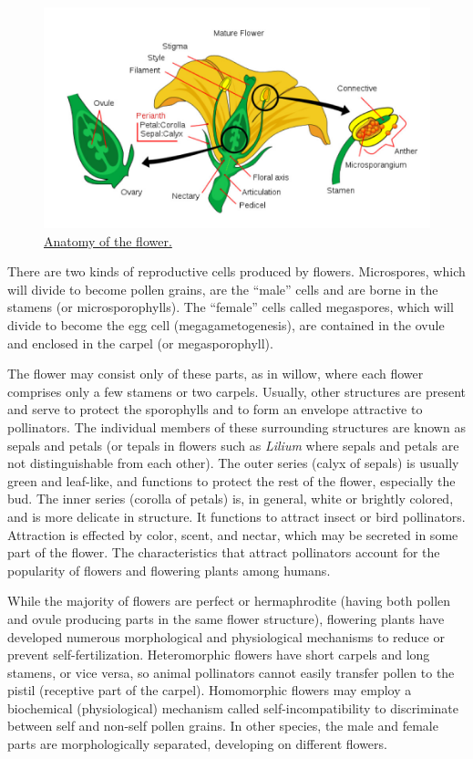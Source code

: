 \begin{figure}

{\centering \includegraphics[width=0.7\linewidth]{./figures/gymnosperms/mature_flower}

}

\caption{\href{https://commons.wikimedia.org/wiki/File:Mature_flower_diagram.svg}{Anatomy
of the flower.}}\label{fig:flower}
\end{figure}

There are two kinds of reproductive cells produced by flowers.
Microspores, which will divide to become pollen grains, are the ``male''
cells and are borne in the stamens (or microsporophylls). The ``female''
cells called megaspores, which will divide to become the egg cell
(megagametogenesis), are contained in the ovule and enclosed in the
carpel (or megasporophyll).

The flower may consist only of these parts, as in willow, where each
flower comprises only a few stamens or two carpels. Usually, other
structures are present and serve to protect the sporophylls and to form
an envelope attractive to pollinators. The individual members of these
surrounding structures are known as sepals and petals (or tepals in
flowers such as \emph{Lilium} where sepals and petals are not distinguishable
from each other). The outer series (calyx of sepals) is usually green
and leaf-like, and functions to protect the rest of the flower,
especially the bud. The inner series (corolla of petals) is, in general,
white or brightly colored, and is more delicate in structure. It
functions to attract insect or bird pollinators. Attraction is effected
by color, scent, and nectar, which may be secreted in some part of the
flower. The characteristics that attract pollinators account for the
popularity of flowers and flowering plants among humans.

While the majority of flowers are perfect or hermaphrodite (having both
pollen and ovule producing parts in the same flower structure),
flowering plants have developed numerous morphological and physiological
mechanisms to reduce or prevent self-fertilization. Heteromorphic
flowers have short carpels and long stamens, or vice versa, so animal
pollinators cannot easily transfer pollen to the pistil (receptive part
of the carpel). Homomorphic flowers may employ a biochemical
(physiological) mechanism called self-incompatibility to discriminate
between self and non-self pollen grains. In other species, the male and
female parts are morphologically separated, developing on different
flowers.

